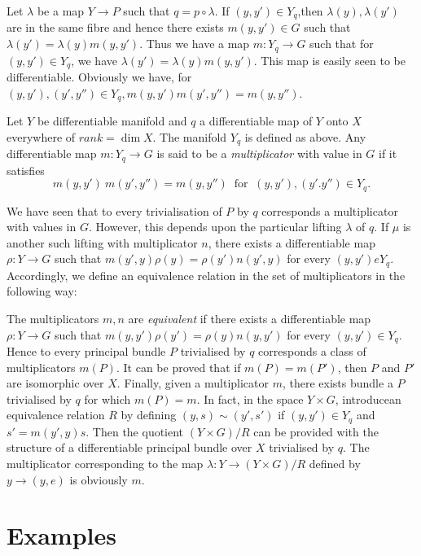 Let $\lambda$ be a map $Y \to P$ such that $q = p \circ \lambda $. If $(y,
y')\in Y_q$,\pageoriginale then $\lambda(y), \lambda (y')$ are in the
same fibre and 
hence there exists $m(y, y')\in G$ such that $\lambda (y') = \lambda
(y) m (y, y')$. Thus we have a map $m : Y_q \to G$ such that for $(y,
y')\in Y_q$, we have $\lambda (y') = \lambda (y) m (y ,
y')$. This map is easily seen to be differentiable. Obviously we
have, for $(y, y'), (y', y'') \in  Y_q , m (y, y') m (y' , y'') = m
(y, y'')$.  

\begin{defn}\label{chap2:sec4:def4} %
  Let $Y$ be differentiable manifold and $q$ a differentiable map of
  $Y$ onto $X$ everywhere of $rank = \dim X$. The manifold $Y_q$ is
  defined as above. Any differentiable map $m : Y_q  \to G$ is said to
  be a \textit{ multiplicator  }with value in $G$ if it satisfies  
  $$
  m (y, y') ~m(y' , y'') = m(y, y'') ~\text{ for }~ (y, y') , (y'.  y'')\in Y_q.
  $$

  We have seen that to every trivialisation of $P$ by $q$ corresponds a
  multiplicator with values in $G$. However, this depends upon the
  particular lifting $\lambda$ of $q$. If $\mu$ is another such
  lifting with multiplicator $n$, there exists a differentiable map
  $\rho : Y \to G$ such that $m(y', y) \rho (y) =\rho (y') n (y' , y)$
  for every $(y, y') e Y_q$. Accordingly, we define an
  equivalence relation in the set of multiplicators in the following
  way:  

  The multiplicators $m, n$ are {\em equivalent } if there exists a
  differentiable map $\rho : Y \to G$ such that $m(y, y') \rho (y') =
  \rho (y) n (y, y')$ for every $(y, y') \in Y_q$. Hence to every
  principal bundle $P$ trivialised by $q$ corresponds a class of
  multiplicators $m(P)$. It can be proved that if $m (P) = m(P')$,
  then $P$ and $P'$ are isomorphic over $X$. Finally, given a
  multiplicator $m$, there exists bundle a $P$ trivialised by $q$ for
  which $m(P) = m$. In fact, in the space $Y \times G$,
  introduce\pageoriginale an 
  equivalence relation $R$ by defining $(y, s ) \sim (y' , s')$ if $(y,
  y') \in Y_q$ and $s' = m (y' , y) s$. Then the quotient $(Y \times
  G)/R$ can be provided with the structure of a differentiable
  principal bundle over $X$ trivialised by $q$. The multiplicator
  corresponding to the map $\lambda : Y \to (Y \times G)/R$ defined by
  $y \to (y, e)$ is obviously $m$.  
\end{defn}

\section{Examples}\label{chap2:sec5}

